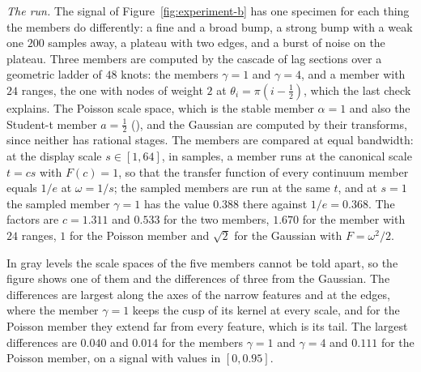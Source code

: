 \begin{example}\label{ex:numerical-run}
\emph{The run.} The signal of Figure~\ref{fig:experiment-b} has one specimen for each thing
the members do differently: a fine and a broad bump, a strong bump with a weak one $200$
samples away, a plateau with two edges, and a burst of noise on the plateau. Three members
are computed by the cascade of lag sections over a geometric ladder of $48$ knots: the
\Matern{} members $\gamma = 1$ and $\gamma = 4$, and a member with $24$ ranges, the one with
nodes of weight $2$ at $\theta_i = \pi(i - \tfrac12)$, which the last check explains. The
Poisson scale space, which is the stable member $\alpha = 1$ and also the Student-t member
$a = \tfrac12$ (), and the Gaussian are computed by their
transforms, since neither has rational stages. The members are compared at equal bandwidth:
at the display scale $s \in [1, 64]$, in samples, a member runs at the canonical scale
$t = cs$ with $F(c) = 1$, so that the transfer function of every continuum member equals
$1/e$ at $\omega = 1/s$; the sampled members are run at the same $t$, and at $s = 1$ the
sampled \Matern{} member $\gamma = 1$ has the value $0.388$ there against $1/e = 0.368$. The
factors are $c = 1.311$ and $0.533$ for the two \Matern{} members, $1.670$ for the member with
$24$ ranges, $1$ for the Poisson member and $\sqrt2$ for the Gaussian with $F = \omega^2/2$.

In gray levels the scale spaces of the five members cannot be told apart, so the figure shows
one of them and the differences of three from the Gaussian. The differences are largest along
the axes of the narrow features and at the edges, where the \Matern{} member $\gamma = 1$
keeps the cusp of its kernel at every scale, and for the Poisson member they extend far from
every feature, which is its tail. The largest differences are $0.040$ and $0.014$ for the
\Matern{} members $\gamma = 1$ and $\gamma = 4$ and $0.111$ for the Poisson member, on a
signal with values in $[0, 0.95]$.


\end{example}
